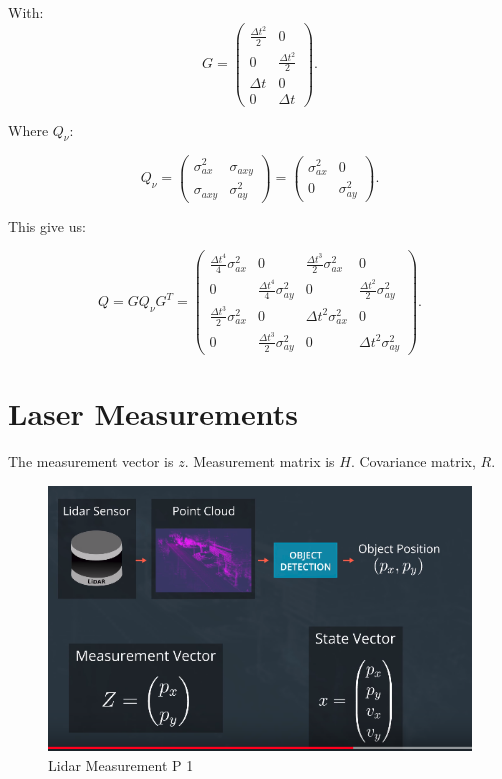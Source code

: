 \documentclass[11pt, a4paper]{article}
\begin{document}
With:
\[
G = \left(\begin{array}{cc}{\frac{\Delta t^{2}}{2}} & {0} \\ {0} & {\frac{\Delta t^{2}}{2}} \\ {\Delta t} & {0} \\ {0} & {\Delta t}\end{array}\right)
.\] 

Where $Q_{\nu}$:


\[
Q_{\nu}=\left(\begin{array}{cc}{\sigma_{a x}^{2}} & {\sigma_{a x y}} \\ {\sigma_{a x y}} & {\sigma_{a y}^{2}}\end{array}\right)=\left(\begin{array}{cc}{\sigma_{a x}^{2}} & {0} \\ {0} & {\sigma_{a y}^{2}}\end{array}\right)
.\] 


This give us:

\[
Q=G Q_{\nu} G^{T}=\left(\begin{array}{cccc}{\frac{\Delta t^{4}}{4} \sigma_{a x}^{2}} & {0} & {\frac{\Delta t^{3}}{2} \sigma_{a x}^{2}} & {0} \\ 
{0} & {\frac{\Delta t^{4}}{4} \sigma_{a y}^{2}} & {0} & {\frac{\Delta t^{2}}{2} \sigma_{a y}^{2}} \\ 
{\frac{\Delta t^{3}}{2} \sigma_{a x}^{2}} & {0} & {\Delta t^{2} \sigma_{a x}^{2}} & {0} \\ 
{0} & {\frac{\Delta t^{3}}{2} \sigma_{a y}^{2}} & {0} & {\Delta t^{2} \sigma_{a y}^{2}}\end{array}\right)
.\] 


\section{Laser Measurements}%
\label{sec:laser_measurements}



The measurement vector is $z$.
Measurement matrix is $H$.
Covariance matrix, $R$.


\begin{figure}[htpb!]
	\centering
	\includegraphics[width=0.8\linewidth]{lidar_p1}
	\caption{Lidar Measurement P 1}
	\label{fig:lidar_p1}
\end{figure}
\end{document}
